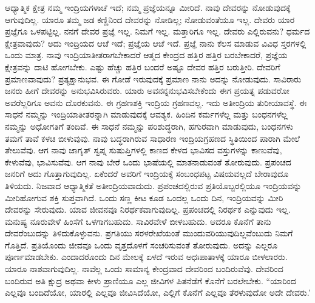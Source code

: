 ಆಧ್ಯಾತ್ಮಿಕ ಕ್ಷೇತ್ರ ನಮ್ಮ ಇಂದ್ರಿಯಗಳಾಚೆ ಇದೆ; ನಮ್ಮ ಪ್ರಜ್ಞೆಯನ್ನೂ ಮೀರಿದೆ. ನಾವು ದೇವರನ್ನು ನೋಡುವುದಕ್ಕೆ ಆಗುವುದಿಲ್ಲ. ಯಾರೂ ತಮ್ಮ ಜಡ ಕಣ್ಣಿನಿಂದ ದೇವರನ್ನು ನೋಡಿಲ್ಲ; ನೋಡುವಂತೆಯೂ ಇಲ್ಲ. ದೇವರು ಯಾರ ಪ್ರಜ್ಞೆಗೂ ಒಳಪಟ್ಟಿಲ್ಲ. ನನಗೆ ದೇವರ ಪ್ರಜ್ಞೆ ಇಲ್ಲ. ನಿಮಗೆ ಇಲ್ಲ. ಮತ್ತಾರಿಗೂ ಇಲ್ಲ. ದೇವರು ಎಲ್ಲಿರುವನು? ಧರ್ಮದ ಕ್ಷೇತ್ರವಾವುದು? ಅದು ಇಂದ್ರಿಯದ ಆಚೆ ಇದೆ; ಪ್ರಜ್ಞೆಯ ಆಚೆ ಇದೆ. ಪ್ರಜ್ಞೆ ನಾನು ಕೆಲಸ ಮಾಡುವ ವಿವಿಧ ಸ್ತರಗಳಲ್ಲಿ ಒಂದು ಮಾತ್ರ. ನಾವು ಇಂದ್ರಿಯಾತೀತರಾಗಬೇಕಾದರೆ ಆತ್ಮದ ಕೇಂದ್ರದ ಹತ್ತಿರ ಹತ್ತಿರ ಬರಬೇಕಾದರೆ, ಪ್ರಜ್ಞೆಯ ಕ್ಷೇತ್ರವನ್ನು ದಾಟಿ ಹೋಗಬೇಕು. ಎಷ್ಟು ಹೆಚ್ಚು ಹತ್ತಿರ ಬಂದರೆ ಅಷ್ಟೂ ದೇವರ ಹತ್ತಿರ ಬರುತ್ತೀರಿ. ದೇವರಿಗೆ ಪ್ರಮಾಣವಾವುದು? ಪ್ರತ್ಯಕ್ಷಾನುಭವ. ಈ ಗೋಡೆ ಇರುವುದಕ್ಕೆ ಪ್ರಮಾಣ ನಾನು ಅದನ್ನು ನೋಡುವುದು. ಸಾವಿರಾರು ಜನರು ಹೀಗೆ ದೇವರನ್ನು ಅನುಭವಿಸಿರುವರು. ಯಾರು ಅವನನ್ನನುಭವಿಸಬೇಕೆಂದು ಈಗ ಪ್ರಯತ್ನ ಪಡುವರೋ ಅವರೆಲ್ಲರಿಗೂ ಅವನು ದೊರಕುವನು. ಈ ಗ್ರಹಣಶಕ್ತಿ ಇಂದ್ರಿಯ ಗ್ರಹಣವಲ್ಲ. ಇದು ಅತೀಂದ್ರಿಯ ತುರೀಯಾವಸ್ಥೆ. ಈ ಸಾಧನೆ ನಮ್ಮನ್ನು ಇಂದ್ರಿಯಾತೀತರನ್ನಾಗಿ ಮಾಡುವುದಕ್ಕೆ ಆವಶ್ಯಕ. ಹಿಂದಿನ ಕರ್ಮಗಳೆಲ್ಲ ಮತ್ತು ಬಂಧನಗಳೆಲ್ಲ ನಮ್ಮನ್ನು ಅಧೋಗತಿಗೆ ತಂದಿವೆ. ಈ ಸಾಧನೆ ನಮ್ಮನ್ನು ಪರಿಶುದ್ಧರಾಗಿ, ಹಗುರವಾಗಿ ಮಾಡುವುದು, ಬಂಧನಗಳು ತಮಗೆ ತಾವೆ ಕಳಚಿ ಬೀಳುವುವು. ನಾವು ಬದ್ಧರಾಗಿರುವ ಸಾಧಾರಣ ಇಂದ್ರಿಯಗ್ರಹಣದ ಸ್ಥಿತಿಯಿಂದ ಪಾರಾಗಿ ಮೇಲೆ ತೇಲುವೆವು. ಆಗ ನಾವು ಜಾಗೃತ್ ಸ್ವಪ್ನ ಸುಷುಪ್ತಿಗಳಲ್ಲಿ ಕಾಣದ ಕೇಳದ ಭಾವಿಸದ ವಸ್ತುಗಳನ್ನು ಕಾಣುವೆವು, ಕೇಳುವೆವು, ಭಾವಿಸುವೆವು. ಆಗ ನಾವು ಬೇರೆ ಒಂದು ಭಾಷೆಯಲ್ಲಿ ಮಾತನಾಡುವಂತೆ ತೋರುವುದು. ಪ್ರಪಂಚದ ಜನರಿಗೆ ಅದು ಗೊತ್ತಾಗುವುದಿಲ್ಲ. ಏಕೆಂದರೆ ಅವರಿಗೆ ಇಂದ್ರಿಯಕ್ಕೆ ಸಂಬಂಧಪಟ್ಟ ವಿಷಯವಲ್ಲದೆ ಬೇರಾವುದೂ ತಿಳಿಯದು. ನಿಜವಾದ ಆಧ್ಯಾತ್ಮಿಕತೆ ಅತೀಂದ್ರಿಯವಾದುದು. ಪ್ರಪಂಚದಲ್ಲಿರುವ ಪ್ರತಿಯೊಬ್ಬರಲ್ಲಿಯೂ ಇಂದ್ರಿಯವನ್ನು ಮೀರಿಹೋಗುವ ಶಕ್ತಿ ಸುಪ್ತವಾಗಿದೆ. ಒಂದು ಸಣ್ಣ ಕೀಟ ಕೂಡ ಒಂದಲ್ಲ ಒಂದು ದಿನ, ಇಂದ್ರಿಯವನ್ನು ಮೀರಿ ದೇವರನ್ನು ಸೇರುವುದು. ಯಾವ ಜೀವನವೂ ನಿರರ್ಥಕವಾಗುವುದಿಲ್ಲ. ಪ್ರಪಂಚದಲ್ಲಿ ನಿರರ್ಥಕ ಎನ್ನುವುದು ಇಲ್ಲ. ಮನುಷ್ಯ ನೂರುವೇಳೆ ಹಿಂಸೆಗೆ ಒಳಗಾಗಬಹುದು. ಸಾವಿರವೇಳೆ ಬೀಳಬಹುದು. ಆದರೂ ಕೊನೆಗೆ ತಾನು ದೇವರೆಂಬುದನ್ನು ತಿಳಿದುಕೊಳ್ಳುವನು. ಪ್ರಗತಿಯು ಸರಳರೇಖೆಯಂತೆ ಮುಂದುವರಿಯುವುದಿಲ್ಲವೆಂಬುದು ನಿಮಗೆ ಗೊತ್ತಿದೆ. ಪ್ರತಿಯೊಂದು ಜೀವವೂ ಒಂದು ವೃತ್ತದೊಳಗೆ ಸಂಚರಿಸುವಂತೆ ತೋರುವುದು. ಅದನ್ನು ಎಲ್ಲರೂ ಪೂರ್ಣಮಾಡಬೇಕು. ಎಂದಾದರೊಂದು ದಿನ ಮೇಲಕ್ಕೆ ಏಳದೆ ಇರುವ ಅಧಃಪಾತಾಳಕ್ಕೆ ಯಾರೂ ಬೀಳಲಾರರು. ಯಾರೂ ನಾಶವಾಗುವುದಿಲ್ಲ. ನಾವೆಲ್ಲ ಒಂದು ಸಾಮಾನ್ಯ ಕೇಂದ್ರವಾದ ದೇವರಿಂದ ಬಂದಿರುವೆವು. ದೇವರಿಂದ ಬಂದಿರುವ ಅತಿ ಕ್ಷುದ್ರ ಅಥವಾ ಕೀಳು ಪ್ರಾಣಿಯೂ ಎಲ್ಲ ಜೀವಿಗಳ ಪಿತನೆಡೆಗೆ ಕೊನೆಗೆ ಬರಲೇಬೇಕು. “ಯಾರಿಂದ ಎಲ್ಲವೂ ಬಂದಿದೆಯೋ, ಯಾರಲ್ಲಿ ಎಲ್ಲವೂ ಜೀವಿಸಿದೆಯೋ, ಎಲ್ಲಿಗೆ ಕೊನೆಗೆ ಎಲ್ಲವೂ ತೆರಳುವುದೋ ಅದೇ ದೇವರು.'

